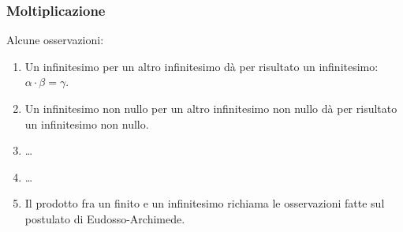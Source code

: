 \subsubsection{Moltiplicazione}
\label{subsec:insnum_moltiplicazione}

\begin{multicols}{2}
Alcune osservazioni:
\begin{enumerate} [nosep]
 \item Un infinitesimo per un altro infinitesimo dà per risultato un 
infinitesimo: \(\alpha \cdot \beta=\gamma\).
 \item Un infinitesimo non nullo per un altro infinitesimo non nullo dà 
per risultato un infinitesimo non nullo.
 \item \dots
 \item \dots
 \item Il prodotto fra un finito e un infinitesimo richiama le osservazioni 
fatte sul postulato di Eudosso-Archimede.
 \end{enumerate}

\begin{center} \scalebox{0.8}{\tabmul} \end{center}


\end{multicols}
